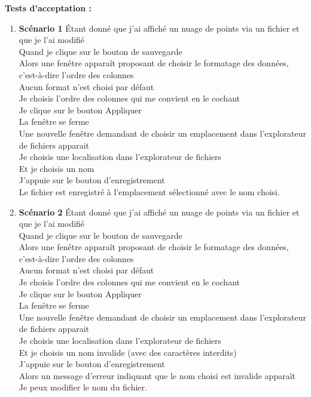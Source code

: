 \documentclass[12pt,titlepage,french]{article}
\begin{document}
\begin{enumerate}
\textbf{Tests d'acceptation :}

\begin{enumerate}
    \item \textbf{Scénario 1}
Étant donné que j'ai affiché un nuage de points via un fichier et que je l'ai modifié\\
Quand je clique sur le bouton de sauvegarde\\
Alors une fenêtre apparaît proposant de choisir le formatage des données, c'est-à-dire l'ordre des colonnes\\
Aucun format n'est choisi par défaut\\
Je choisis l'ordre des colonnes qui me convient en le cochant\\
Je clique sur le bouton Appliquer\\
La fenêtre se ferme\\
Une nouvelle fenêtre demandant de choisir un emplacement dans l'explorateur de fichiers apparait\\
Je choisis une localisation dans l'explorateur de fichiers\\
Et je choisis un nom\\
J'appuie sur le bouton d'enregistrement\\
Le fichier est enregistré à l'emplacement sélectionné avec le nom choisi.

    \item \textbf{Scénario 2}
Étant donné que j'ai affiché un nuage de points via un fichier et que je l'ai modifié\\
Quand je clique sur le bouton de sauvegarde\\
Alors une fenêtre apparaît proposant de choisir le formatage des données, c'est-à-dire l'ordre des colonnes\\
Aucun format n'est choisi par défaut\\
Je choisis l'ordre des colonnes qui me convient en le cochant\\
Je clique sur le bouton Appliquer\\
La fenêtre se ferme\\
Une nouvelle fenêtre demandant de choisir un emplacement dans l'explorateur de fichiers apparait\\
Je choisis une localisation dans l'explorateur de fichiers\\
Et je choisis un nom invalide (avec des caractères interdits)\\
J'appuie sur le bouton d'enregistrement\\
Alors un message d'erreur indiquant que le nom choisi est invalide apparaît\\
Je peux modifier le nom du fichier.


\end{enumerate}
\end{enumerate}
\end{document}
